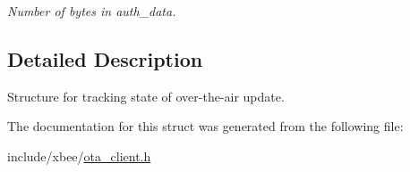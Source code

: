 \begin{DoxyCompactItemize}
\begin{DoxyCompactList}\small\item\em Number of bytes in {\ttfamily auth\-\_\-data}. \end{DoxyCompactList}\end{DoxyCompactItemize}


\subsection{Detailed Description}
Structure for tracking state of over-\/the-\/air update. 

The documentation for this struct was generated from the following file\-:\begin{DoxyCompactItemize}
\item 
include/xbee/\hyperlink{ota__client_8h}{ota\-\_\-client.\-h}\end{DoxyCompactItemize}
